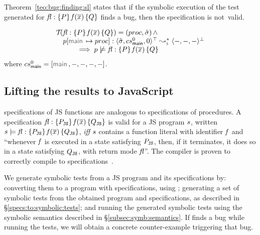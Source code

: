 Theorem~\ref{teo:bug:finding:sl} states that if the symbolic execution of the 
test generated for ${\mathit{fl}} : \{ P \} \, \mathit{f}(\overline{x}) \, \{ Q \}$ finds a bug, then the specification 
is not~valid.

\begin{theorem}\label{teo:bug:finding:sl}
$$
\begin{array}{l}
\testify{}(\specsig{\pass}{\pid(\jvec{x})}{\qass}{\flag})  = (\proc, \sstate) \, \wedge \\
\quad
  \prog[\jsilmain \mapsto \proc] :  \transabssemrule{\sstate, \csmain, 0}{-, -, -}{\top}{\bot}{\symbolic} \\ \quad \qquad 
    \implies  
         \prog \not\satisfies \specsig{\pass}{\pid(\jvec{x})}{\qass}{\flag}
\end{array}
$$
\noindent where  $\csmain = [ \jsilmain, -, -, -, - ]$.
\end{theorem}


\subsection{Lifting the results to JavaScript}

\javert specifications of JS functions are analogous to \jsil specifications of \jsil procedures.
A \javert specification ${\mathit{fl}} : \{ P_{\mathtt{JS}} \} \, \mathit{f}(\overline{x}) \, \{ Q_{\mathtt{JS}} \}$
is valid for a JS program $s$, written $s \models {\ensuremath{\mathit{fl}}} : \{ P_{\mathtt{JS}} \} \, \mathit{f}(\overline{x}) \, \{ Q_{\mathtt{JS}} \}$, 
\emph{iff} $s$ contains a function literal with identifier $\mathit{f}$ and ``whenever $\mathit{f}$ is executed in a state satisfying $P_{\mathtt{JS}}$, then, 
if it terminates, it does so in a state satisfying $Q_{\mathtt{JS}}$, with return mode $\mathit{fl}$''. 
The \JSComp compiler is proven to correctly compile \javert to \jsil specifications~\cite{javert}.

We generate symbolic tests from a JS program and its \javert specifications by: converting them to a \jsil program with \jsil specifications, using \jstojsil; generating a set of symbolic tests from the obtained \jsil program and \jsil specifications, as described in \S\ref{specs:to:symbolic:tests}; and running the generated \jsil symbolic tests using the \jsil symbolic semantics described in \S\ref{subsec:symb:semantics}. 
If \cosette finds a bug while running the tests, we will obtain a concrete counter-example triggering that bug.

